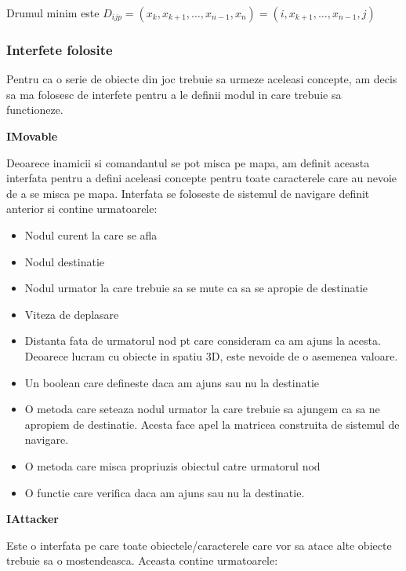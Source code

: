 \documentclass[12pt, a4paper]{article}
\begin{document}
	Drumul minim este $D_{ijp} = (x_k, x_{k+1}, \dots, x_{n-1}, x_n) = (i, x_{k+1}, \dots, x_{n-1}, j)$
	
	\subsubsection{Interfete folosite}
	
	Pentru ca o serie de obiecte din joc trebuie sa urmeze aceleasi concepte, am decis sa ma folosesc de interfete pentru a le definii modul in care trebuie sa functioneze. 
	\newline
	
	\textbf{IMovable}
	
	Deoarece inamicii si comandantul se pot misca pe mapa, am definit aceasta interfata pentru a defini aceleasi concepte pentru toate caracterele care au nevoie de a se misca pe mapa. Interfata se foloseste de sistemul de navigare definit anterior si contine urmatoarele:
	
	\begin{itemize}
		\item Nodul curent la care se afla
		\item Nodul destinatie
		\item Nodul urmator la care trebuie sa se mute ca sa se apropie de destinatie
		\item Viteza de deplasare
		\item Distanta fata de urmatorul nod pt care consideram ca am ajuns la acesta. Deoarece lucram cu obiecte in spatiu 3D, este nevoide de o asemenea valoare.
		\item Un boolean care defineste daca am ajuns sau nu la destinatie
		\item O metoda care seteaza nodul urmator la care trebuie sa ajungem ca sa ne apropiem de destinatie. Acesta face apel la matricea construita de sistemul de navigare.
		\item O metoda care misca propriuzis obiectul catre urmatorul nod
		\item O functie care verifica daca am ajuns sau nu la destinatie.
	\end{itemize}
	\bigskip


	\textbf{IAttacker}
	
	 Este o interfata pe care toate obiectele/caracterele care vor sa atace alte obiecte trebuie sa o mostendeasca. Aceasta contine urmatoarele:
	 
\end{document}
